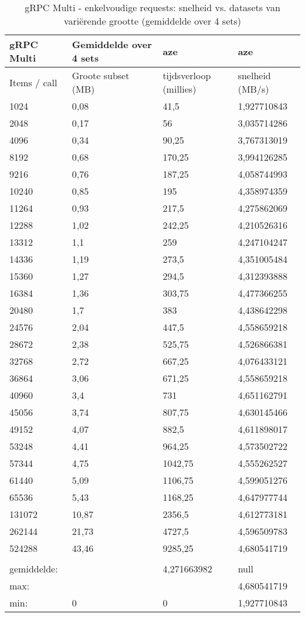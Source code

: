\begin{table}
    \centering
    \begin{tabular}{llll}
        \toprule
        \textbf{gRPC Multi} & \textbf{Gemiddelde over 4 sets} & \textbf{aze} & \textbf{aze} \\
        \midrule
        Items / call & Groote subset (MB) & tijdsverloop (millies) & snelheid (MB/s) \\
        1024 & 0,08 & 41,5 & 1,927710843 \\
        2048 & 0,17 & 56 & 3,035714286 \\
        4096 & 0,34 & 90,25 & 3,767313019 \\
        8192 & 0,68 & 170,25 & 3,994126285 \\
        9216 & 0,76 & 187,25 & 4,058744993 \\
        10240 & 0,85 & 195 & 4,358974359 \\
        11264 & 0,93 & 217,5 & 4,275862069 \\
        12288 & 1,02 & 242,25 & 4,210526316 \\
        13312 & 1,1 & 259 & 4,247104247 \\
        14336 & 1,19 & 273,5 & 4,351005484 \\
        15360 & 1,27 & 294,5 & 4,312393888 \\
        16384 & 1,36 & 303,75 & 4,477366255 \\
        20480 & 1,7 & 383 & 4,438642298 \\
        24576 & 2,04 & 447,5 & 4,558659218 \\
        28672 & 2,38 & 525,75 & 4,526866381 \\
        32768 & 2,72 & 667,25 & 4,076433121 \\
        36864 & 3,06 & 671,25 & 4,558659218 \\
        40960 & 3,4 & 731 & 4,651162791 \\
        45056 & 3,74 & 807,75 & 4,630145466 \\
        49152 & 4,07 & 882,5 & 4,611898017 \\
        53248 & 4,41 & 964,25 & 4,573502722 \\
        57344 & 4,75 & 1042,75 & 4,555262527 \\
        61440 & 5,09 & 1106,75 & 4,599051276 \\
        65536 & 5,43 & 1168,25 & 4,647977744 \\
        131072 & 10,87 & 2356,5 & 4,612773181 \\
        262144 & 21,73 & 4727,5 & 4,596509783 \\
        524288 & 43,46 & 9285,25 & 4,680541719 \\
         &  &  &  \\
        gemiddelde: &  & 4,271663982 & null \\
        max: &  &  & 4,680541719 \\
        min: & 0 & 0 & 1,927710843 \\
        \bottomrule
    \end{tabular}
    \caption{gRPC Multi - enkelvoudige requests: snelheid vs. datasets van vari\"erende grootte (gemiddelde over 4 sets)}
    \label{tab:gRPCMultienkelvoudig}
\end{table}

